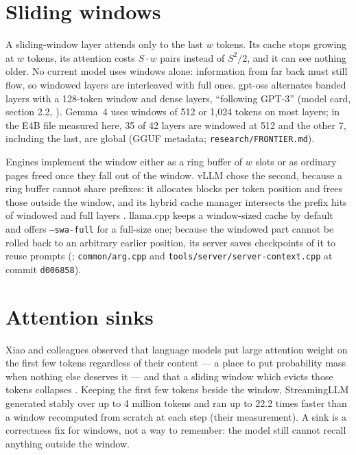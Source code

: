 \section{Sliding windows}

A sliding-window layer attends only to the last $w$ tokens. Its cache stops
growing at $w$ tokens, its attention costs $S\cdot w$ pairs instead of
$S^{2}/2$, and it can see nothing older. No current model uses windows alone:
information from far back must still flow, so windowed layers are interleaved
with full ones. gpt-oss alternates banded layers with a 128-token window and
dense layers, ``following GPT-3'' (model card, section 2.2,
\cite{openai2025gptoss}). Gemma~4 uses windows of 512 or 1,024 tokens on most
layers; in the E4B file measured here, 35 of 42 layers are windowed at 512 and
the other 7, including the last, are global (GGUF metadata;
\texttt{research/FRONTIER.md}).

Engines implement the window either as a ring buffer of $w$ slots or as
ordinary pages freed once they fall out of the window. vLLM chose the second,
because a ring buffer cannot share prefixes: it allocates blocks per token
position and frees those outside the window, and its hybrid cache manager
intersects the prefix hits of windowed and full layers
\cite{vllm2026hybridkv}. llama.cpp keeps a window-sized cache by default and
offers \texttt{--swa-full} for a full-size one; because the windowed part
cannot be rolled back to an arbitrary earlier position, its server saves
checkpoints of it to reuse prompts (; \texttt{common/arg.cpp}
and \texttt{tools/server/server-context.cpp} at commit \texttt{d006858}).

\section{Attention sinks}

Xiao and colleagues observed that language models put large attention weight
on the first few tokens regardless of their content --- a place to put
probability mass when nothing else deserves it --- and that a sliding window
which evicts those tokens collapses \cite{xiao2024streamingllm}. Keeping the
first few tokens beside the window, StreamingLLM generated stably over up to
4 million tokens and ran up to 22.2 times faster than a window recomputed from
scratch at each step (their measurement). A sink is a correctness fix for
windows, not a way to remember: the model still cannot recall anything outside
the window.


